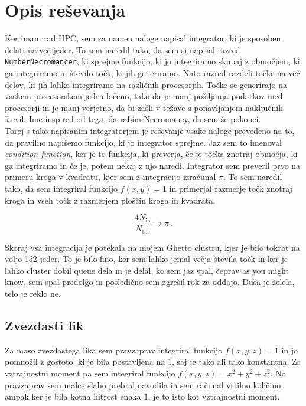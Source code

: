 \documentclass[a4paper]{article}
\begin{document}
\section{Opis reševanja}
Ker imam rad HPC, sem za namen naloge napisal integrator, ki je sposoben delati na več jeder. To sem naredil tako, da sem
si napisal razred \texttt{NumberNecromancer}, ki sprejme funkcijo, ki jo integriramo skupaj z območjem, ki ga integriramo in 
število točk, ki jih generiramo. Nato razred razdeli točke na več delov, ki jih lahko integriramo na različnih procesorjih. 
Točke se generirajo na vsakem procesorskem jedru ločeno, tako da je manj pošiljanja podatkov med procesorji in je manj verjetno, da 
bi zašli v težave s ponavljanjem naključnih števil. Ime inspired od tega, da rabim Necromancy, da sem še pokonci. \\

Torej s tako napisanim integratorjem je reševanje vsake naloge prevedeno na to, da pravilno napišemo funkcijo, ki jo integrator
sprejme. Jaz sem to imenoval \textit{condition function}, ker je to funkcija, ki preverja, če je točka znotraj območja, ki ga
integriramo in če je, potem nekaj z njo naredi. Integrator sem preveril prvo na primeru kroga v kvadratu, kjer sem z integracijo
izračunal $\pi$. To sem naredil tako, da sem integriral funkcijo $f(x,y) = 1$ in primerjal razmerje točk znotraj kroga in vseh
točk z razmerjem ploščin kroga in kvadrata. 

\begin{equation}
    \frac{4 N_{\mathrm{in}}}{N_{\mathrm{tot}}} \to \pi \>.
\end{equation}

Skoraj vsa integracija je potekala na mojem Ghetto clustru, kjer je bilo tokrat na voljo 152 jeder. To je bilo fino, ker 
sem lahko jemal večja števila točk in ker je lahko cluster dobil queue dela in je delal, ko sem jaz spal, čeprav as you might know,
sem spal predolgo in posledično sem zgrešil rok za oddajo. Duša je želela, telo je reklo ne. \\

\subsection{Zvezdasti lik}
Za maso zvezdastega lika sem pravzaprav integriral funkcijo $f(x,y,z) = 1$ in jo pomnožil z gostoto, ki je bila postavljena na
$1$, saj je tako ali tako konstantna. Za vztrajnostni moment pa sem integriral funkcijo $f(x,y,z) = x^2 + y^2 + z^2$. No pravzaprav
sem malce slabo prebral navodila in sem računal vrtilno količino, ampak ker je bila kotna hitrost enaka $1$, je to isto kot
vztrajnostni moment. \\
\end{document}
